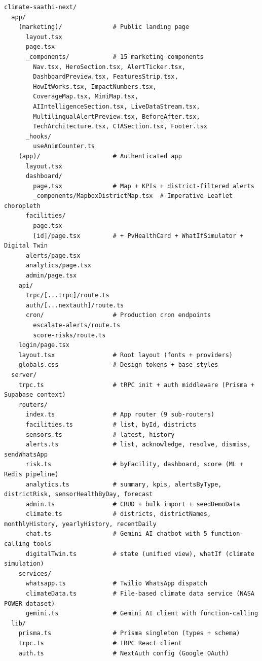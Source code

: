 \documentclass[12pt,a4paper]{report}
\begin{document}
\begin{lstlisting}
climate-saathi-next/
  app/
    (marketing)/              # Public landing page
      layout.tsx
      page.tsx
      _components/            # 15 marketing components
        Nav.tsx, HeroSection.tsx, AlertTicker.tsx,
        DashboardPreview.tsx, FeaturesStrip.tsx,
        HowItWorks.tsx, ImpactNumbers.tsx,
        CoverageMap.tsx, MiniMap.tsx,
        AIIntelligenceSection.tsx, LiveDataStream.tsx,
        MultilingualAlertPreview.tsx, BeforeAfter.tsx,
        TechArchitecture.tsx, CTASection.tsx, Footer.tsx
      _hooks/
        useAnimCounter.ts
    (app)/                    # Authenticated app
      layout.tsx
      dashboard/
        page.tsx              # Map + KPIs + district-filtered alerts
        _components/MapboxDistrictMap.tsx  # Imperative Leaflet choropleth
      facilities/
        page.tsx
        [id]/page.tsx         # + PvHealthCard + WhatIfSimulator + Digital Twin
      alerts/page.tsx
      analytics/page.tsx
      admin/page.tsx
    api/
      trpc/[...trpc]/route.ts
      auth/[...nextauth]/route.ts
      cron/                   # Production cron endpoints
        escalate-alerts/route.ts
        score-risks/route.ts
    login/page.tsx
    layout.tsx                # Root layout (fonts + providers)
    globals.css               # Design tokens + base styles
  server/
    trpc.ts                   # tRPC init + auth middleware (Prisma + Supabase context)
    routers/
      index.ts                # App router (9 sub-routers)
      facilities.ts           # list, byId, districts
      sensors.ts              # latest, history
      alerts.ts               # list, acknowledge, resolve, dismiss, sendWhatsApp
      risk.ts                 # byFacility, dashboard, score (ML + Redis pipeline)
      analytics.ts            # summary, kpis, alertsByType, districtRisk, sensorHealthByDay, forecast
      admin.ts                # CRUD + bulk import + seedDemoData
      climate.ts              # districts, districtNames, monthlyHistory, yearlyHistory, recentDaily
      chat.ts                 # Gemini AI chatbot with 5 function-calling tools
      digitalTwin.ts          # state (unified view), whatIf (climate simulation)
    services/
      whatsapp.ts             # Twilio WhatsApp dispatch
      climateData.ts          # File-based climate data service (NASA POWER dataset)
      gemini.ts               # Gemini AI client with function-calling
  lib/
    prisma.ts                 # Prisma singleton (types + schema)
    trpc.ts                   # tRPC React client
    auth.ts                   # NextAuth config (Google OAuth)

\end{lstlisting}
\end{document}
